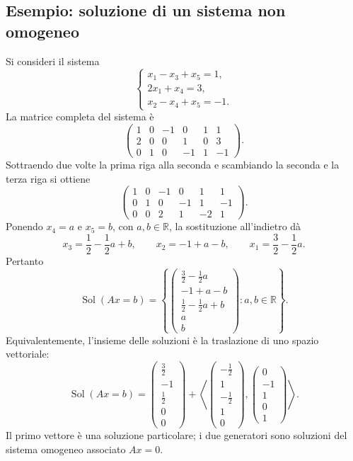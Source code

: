 \documentclass[11pt,a4paper]{article}
\newcommand{\RR}{\mathbb{R}}
\theoremstyle{plain}
\theoremstyle{definition}
\theoremstyle{remark}
\begin{document}
\subsection{Esempio: soluzione di un sistema non omogeneo}
Si consideri il sistema
\[
\begin{cases}
 x_1-x_3+x_5=1,\\
 2x_1+x_4=3,\\
 x_2-x_4+x_5=-1.
\end{cases}
\]
La matrice completa del sistema è
\[
\left(\begin{array}{ccccc|c}
1&0&-1&0&1&1\\2&0&0&1&0&3\\0&1&0&-1&1&-1
\end{array}\right).
\]
Sottraendo due volte la prima riga alla seconda e scambiando la seconda e la terza riga si ottiene
\[
\left(\begin{array}{ccccc|c}
1&0&-1&0&1&1\\0&1&0&-1&1&-1\\0&0&2&1&-2&1
\end{array}\right).
\]
Ponendo $x_4=a$ e $x_5=b$, con $a,b\in\RR$, la sostituzione all'indietro dà
\[
 x_3=\frac12-\frac12a+b,\qquad
 x_2=-1+a-b,\qquad
 x_1=\frac32-\frac12a.
\]
Pertanto
\[
\operatorname{Sol}(Ax=b)=
\left\{\begin{pmatrix}
\frac32-\frac12a\\-1+a-b\\\frac12-\frac12a+b\\a\\b
\end{pmatrix}:a,b\in\RR\right\}.
\]
Equivalentemente, l'insieme delle soluzioni è la traslazione di uno spazio vettoriale:
\[
\operatorname{Sol}(Ax=b)=
\begin{pmatrix}\frac32\\-1\\\frac12\\0\\0\end{pmatrix}
+\left\langle
\begin{pmatrix}-\frac12\\1\\-\frac12\\1\\0\end{pmatrix},
\begin{pmatrix}0\\-1\\1\\0\\1\end{pmatrix}
\right\rangle.
\]
Il primo vettore è una soluzione particolare; i due generatori sono soluzioni del sistema omogeneo associato $Ax=0$.
\end{document}
